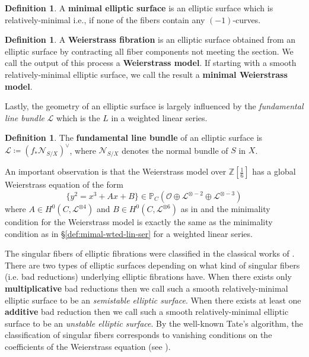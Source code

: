 \documentclass[a4paper,12pt]{amsart}
\theoremstyle{definition}
\newtheorem{defn}[thm]{Definition}
\newcommand{\bP}{\mathbb{P}}
\newcommand{\bZ}{\mathbb{Z}}
\newcommand{\cO}{\mathcal{O}}
\newcommand{\cL}{\mathcal{L}}
\begin{document}
	\begin{defn}\label{def:minimal_ell_surf} 
		A \textbf{minimal elliptic surface} is an elliptic surface which is relatively-minimal i.e., if none of the fibers contain any $(-1)$-curves.
	\end{defn}
	
	\begin{defn}\label{def:weier_ell_surf} 
		A \textbf{Weierstrass fibration} is an elliptic surface obtained from an elliptic surface by contracting all fiber components not meeting the section. We call the output of this process a \textbf{Weierstrass model}. If starting with a smooth relatively-minimal elliptic surface, we call the result a \textbf{minimal Weierstrass model}.  
	\end{defn}
	
	Lastly, the geometry of an elliptic surface is largely influenced by the \emph{fundamental line bundle} $\cL$ which is the $L$ in a weighted linear series.
	
	\begin{defn} The \textbf{fundamental line bundle} of an elliptic surface is $\cL \coloneqq (f_* \mathcal{N}_{S/X})^\vee$, where $\mathcal{N}_{S/X}$ denotes the normal bundle of $S$ in $X$. 
		
	\end{defn}
	
	An important observation is that the Weierstrass model over $\bZ\left[\frac{1}{6}\right]$ has a global Weierstrass equation of the form
	\begin{equation}\label{eqn:weierstrass}
		\{y^2 = x^3 + Ax + B\} \in \bP_C(\cO \oplus \cL^{\otimes -2} \oplus \cL^{\otimes -3})
	\end{equation}
	where $A \in H^0(C, \cL^{\otimes 4})$ and $B \in H^0(C, \cL^{\otimes 6})$ as in \cite[Cor. 2.5]{Miranda2} and the minimality condition for the Weierstrass model is exactly the same as the minimality condition as in \S \ref{def:mimal-wted-lin-ser} for a weighted linear series. 
	
	
	
	The singular fibers of elliptic fibrations were classified in the classical works of \cite{Kodaira, Neron}. There are two types of elliptic surfaces depending on what kind of singular fibers (i.e. bad reductions) underlying elliptic fibrations have. When there exists only \textbf{multiplicative} bad reductions then we call such a smooth relatively-minimal elliptic surface to be an \textit{semistable elliptic surface}. When there exists at least one \textbf{additive} bad reduction then we call such a smooth relatively-minimal elliptic surface to be an \textit{unstable elliptic surface}. By the well-known Tate's algorithm, the classification of singular fibers corresponds to vanishing conditions on the coefficients of the Weierstrass equation (see \cite[Table 1]{Herfurtner}).
	
\end{document}
